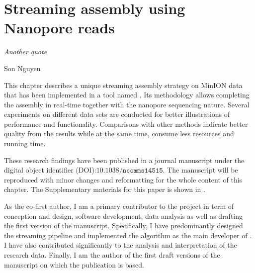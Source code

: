 \chapter{Streaming assembly using Nanopore reads}\label{ch:npscarf}
\thispagestyle{empty}
\vspace*{\fill}
\epigraph{\emph{Another quote}}
{Son Nguyen}

\clearpage
This chapter describes a unique streaming assembly strategy on MinION data that has been implemented in a tool named \npscarf{}. Its methodology allows completing the assembly in real-time together with the nanopore sequencing nature. Several experiments on different data sets are conducted for better illustrations of \npscarf{} performance and functionality. Comparisons with other methods indicate better quality from the results while at the same time, consume less resources and running time.

These research findings have been published in a journal manuscript under the digital object identifier (DOI):$\mathtt{10.1038/ncomms14515}$. The manuscript will be reproduced with minor changes and reformatting for the whole content of this chapter.
The Supplementary materials for this paper is shown in .

As the co-first author, I am a primary contributor to the project in term of conception and design, software development, data analysis as well as drafting the first version of the manuscript. 
Specifically, I have predominantly designed the streaming pipeline and implemented the algorithm as the main developer of \npscarf{}. 
I have also contributed significantly to the analysis and interpretation of the research data. 
Finally, I am the author of the first draft versions of the manuscript on which the publication is based.

